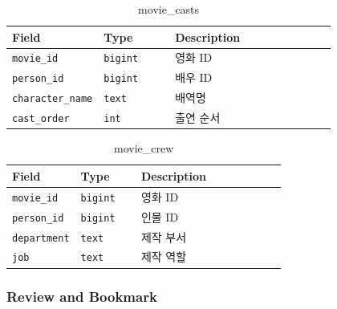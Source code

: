 \documentclass[11pt,a4paper]{article}
\renewcommand{\arraystretch}{1.18}
\begin{document}
\begin{table}[H]
\centering
\footnotesize
\setlength{\tabcolsep}{5pt}
\renewcommand{\arraystretch}{1.28}
\begin{tabularx}{\linewidth}{@{}>{\RaggedRight\arraybackslash}p{0.25\linewidth}>{\RaggedRight\arraybackslash}p{0.22\linewidth}>{\RaggedRight\arraybackslash}X@{}}
\toprule
\textbf{Field} & \textbf{Type} & \textbf{Description} \\
\midrule
\texttt{movie\_\allowbreak{}id} & \texttt{bigint} & 영화 ID \\
\texttt{person\_\allowbreak{}id} & \texttt{bigint} & 배우 ID \\
\texttt{character\_\allowbreak{}name} & \texttt{text} & 배역명 \\
\texttt{cast\_\allowbreak{}order} & \texttt{int} & 출연 순서 \\
\bottomrule
\end{tabularx}
\caption{movie\_casts}
\end{table}

\begin{table}[H]
\centering
\footnotesize
\setlength{\tabcolsep}{5pt}
\renewcommand{\arraystretch}{1.28}
\begin{tabularx}{\linewidth}{@{}>{\RaggedRight\arraybackslash}p{0.25\linewidth}>{\RaggedRight\arraybackslash}p{0.22\linewidth}>{\RaggedRight\arraybackslash}X@{}}
\toprule
\textbf{Field} & \textbf{Type} & \textbf{Description} \\
\midrule
\texttt{movie\_\allowbreak{}id} & \texttt{bigint} & 영화 ID \\
\texttt{person\_\allowbreak{}id} & \texttt{bigint} & 인물 ID \\
\texttt{department} & \texttt{text} & 제작 부서 \\
\texttt{job} & \texttt{text} & 제작 역할 \\
\bottomrule
\end{tabularx}
\caption{movie\_crew}
\end{table}

\hypertarget{review-and-bookmark-1}{%
\subsubsection{Review and Bookmark}\label{review-and-bookmark-1}}
\end{document}
